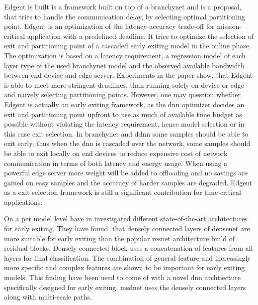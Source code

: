 Edgent \cite{li_edge_2018} is built is a framework built on top of a \gls{branchynet} and is a proposal, that tries to handle the communication delay, by selecting optimal partitioning point. Edgent is an optimization of the latency-accuracy trade-off for mission-critical application with a predefined deadline. It tries to optimize the selection of exit and partitioning point of a cascaded early exiting model in the online phase. The optimization is based on a latency requirement, a regression model of each layer type of the used \gls{branchynet} model and the observed available bandwidth between end device and edge server. Experiments in the paper show, that Edgent is able to meet more stringent deadlines, than running solely on device or edge and naively selecting partitioning points. However, one may question whether Edgent is actually an early exiting framework, as the \gls{dnn} optimizer decides an exit and partitioning point upfront to use as much of available time budget as possible without violating the latency requirement, hence model selection or in this case exit selection. In \gls{branchynet} and \gls{ddnn} some samples should be able to exit early, thus when the \gls{dnn} is cascaded over the network, some samples should be able to exit locally on end devices to reduce expensive cost of network communication in terms of both latency and energy usage. When using a powerful edge server more weight will be added to offloading and no savings are gained on easy samples and the accuracy of harder samples are degraded. Edgent as a exit selection framework is still a significant contribution for time-critical applications. 

On a per model level \citeauthor{huang_multi-scale_2017} have in \cite{huang_multi-scale_2017} investigated different state-of-the-art architectures for early exiting. They have found, that  densely connected layers of \gls{densenet} \cite{huang_densely_2016} are more suitable for early exiting than the popular \gls{resnet} architecture build of residual blocks. Densely connected block uses a concatenation of features from all layers for final classification. The combination of  general feature and increasingly more specific and complex features are shown to be important for early exiting models. This finding have been used to come of with a novel \gls{dnn} archtiecture specifically designed for early exiting. \gls{msdnet} \cite{huang_multi-scale_2017} uses the densely connected layers along with multi-scale paths.

